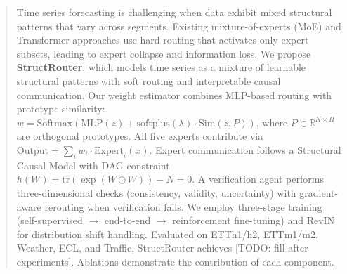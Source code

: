 \begin{abstract}
Time series forecasting is challenging when data exhibit mixed structural patterns that vary across segments. Existing mixture-of-experts (MoE) and Transformer approaches use hard routing that activates only expert subsets, leading to expert collapse and information loss. We propose \textbf{StructRouter}, which models time series as a mixture of learnable structural patterns with soft routing and interpretable causal communication. Our weight estimator combines MLP-based routing with prototype similarity: $w = \text{Softmax}(\text{MLP}(z) + \text{softplus}(\lambda) \cdot \text{Sim}(z, P))$, where $P \in \mathbb{R}^{K \times H}$ are orthogonal prototypes. All five experts contribute via $\text{Output} = \sum_i w_i \cdot \text{Expert}_i(x)$. Expert communication follows a Structural Causal Model with DAG constraint $h(W) = \text{tr}(\exp(W \odot W)) - N = 0$. A verification agent performs three-dimensional checks (consistency, validity, uncertainty) with gradient-aware rerouting when verification fails. We employ three-stage training (self-supervised $\rightarrow$ end-to-end $\rightarrow$ reinforcement fine-tuning) and RevIN for distribution shift handling. Evaluated on ETTh1/h2, ETTm1/m2, Weather, ECL, and Traffic, StructRouter achieves [TODO: fill after experiments]. Ablations demonstrate the contribution of each component.
\end{abstract}

